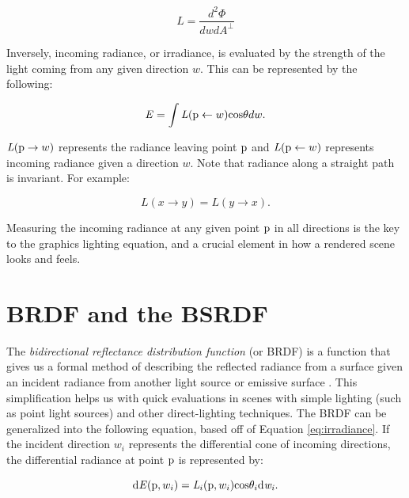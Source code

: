 \documentclass[12pt]{ucthesis}
\begin{document}
\begin{equation}
\mathit{L} = \frac{\mathit{d^{2}\Phi}}{\mathit{dwdA}^\perp}
\label{eq:radiance}
\end{equation}

Inversely, incoming radiance, or irradiance, is evaluated by the strength of the light coming from any given direction $w$.  This  can be represented by the following:

\begin{equation}
\mathit{E} = \int\mathit{L}(\textup{p} \leftarrow w)\textup{cos}\theta dw.
\label{eq:irradiance}
\end{equation}

$\mathit{L}(\textup{p} \to w)$ represents the radiance leaving point $\textup{p}$ and $\mathit{L}(\textup{p} \leftarrow w)$ represents incoming radiance given a direction $w$.  Note that radiance along a straight path is invariant.  For example:

\begin{equation}
L(x \to y) = L(y \to x).
\label{eq:invariance}
\end{equation}

Measuring the incoming radiance at any given point $\textup{p}$ in all directions is the key to the graphics lighting equation, and a crucial element in how a rendered scene looks and feels.

\section{BRDF and the BSRDF}

The \textit{bidirectional reflectance distribution function} (or BRDF) is a function that gives us a formal method of describing the reflected radiance from a surface given an incident radiance from another light source or emissive surface \cite{brdf}.  This simplification helps us with quick evaluations in scenes with simple lighting (such as point light sources) and other direct-lighting techniques.  The BRDF can be generalized into the following equation, based off of Equation \ref{eq:irradiance}.  If the incident direction $w_{i}$ represents the differential cone of incoming directions, the differential radiance at point $\textup{p}$ is represented by:

\begin{equation}
\textup{d}\mathit{E}(\textup{p}, w_{i}) = \mathit{L}_{i}(\textup{p}, w_{i})\textup{cos}\theta_{i} \textup{d}\mathit{w_{i}}.
\label{eq:brdf}
\end{equation}
\end{document}
